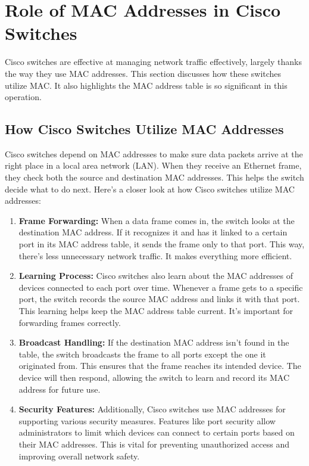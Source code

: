 \documentclass[11pt,a4paper]{article}
\begin{document}
\section*{Role of MAC Addresses in Cisco Switches}

Cisco switches are effective at managing network traffic effectively, largely thanks the way they use MAC addresses. This section discusses how these switches utilize MAC. It also highlights the MAC address table is so significant in this operation.


\subsection*{How Cisco Switches Utilize MAC Addresses}

Cisco switches depend on MAC addresses to make sure data packets arrive at the right place in a local area network (LAN). When they receive an Ethernet frame, they check both the source and destination MAC addresses. This helps the switch decide what to do next. Here’s a closer look at how Cisco switches utilize MAC addresses:

\begin{enumerate}
    \item \textbf{Frame Forwarding:} When a data frame comes in, the switch looks at the destination MAC address. If it recognizes it and has it linked to a certain port in its MAC address table, it sends the frame only to that port. This way, there's less unnecessary network traffic. It makes everything more efficient.

    \item \textbf{Learning Process:} Cisco switches also learn about the MAC addresses of devices connected to each port over time. Whenever a frame gets to a specific port, the switch records the source MAC address and links it with that port. This learning helps keep the MAC address table current. It's important for forwarding frames correctly.

    \item \textbf{Broadcast Handling:} If the destination MAC address isn’t found in the table, the switch broadcasts the frame to all ports except the one it originated from. This ensures that the frame reaches its intended device. The device will then respond, allowing the switch to learn and record its MAC address for future use.

    \item \textbf{Security Features:} Additionally, Cisco switches use MAC addresses for supporting various security measures. Features like port security allow administrators to limit which devices can connect to certain ports based on their MAC addresses. This is vital for preventing unauthorized access and improving overall network safety.

\end{enumerate}
\end{document}
